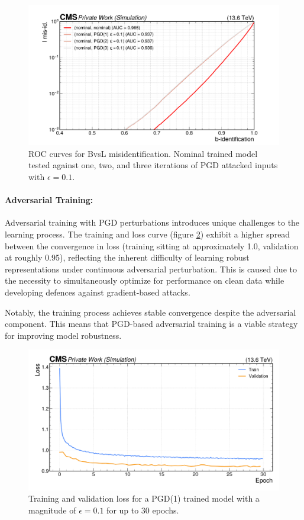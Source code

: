 \begin{figure}[h]
\centering
    \includegraphics[width=15cm]{media/output/roc_bvsl_pgd_its_1_2_3.pdf}
    \caption{ROC curves for BvsL misidentification. Nominal trained model tested against one, two, and three iterations of PGD attacked inputs with $\epsilon=0.1$.}
    \label{fig:pgd_iterations}
\end{figure}

\paragraph{Adversarial Training:} Adversarial training with PGD perturbations introduces unique challenges to the learning process. The training and loss curve (figure \ref{fig:pgd_loss_curve}) exhibit a higher spread between the convergence in loss (training sitting at approximately 1.0, validation at roughly 0.95), reflecting the inherent difficulty of learning robust representations under continuous adversarial perturbation. This is caused due to the necessity to simultaneously optimize for performance on clean data while developing defences against gradient-based attacks.

Notably, the training process achieves stable convergence despite the adversarial component. This means that PGD-based adversarial training is a viable strategy for improving model robustness.

\begin{figure}[h]
\centering
    
    \includegraphics[width=15cm]{media/output/pgd_loss_validation.pdf}
    \caption{Training and validation loss for a PGD(1) trained model with a magnitude of $\epsilon=0.1$ for up to 30 epochs.}
    \label{fig:pgd_loss_curve}
\end{figure}


